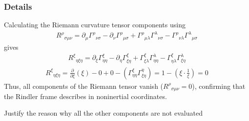 \documentclass[letterpaper,10pt,english]{jupyterBook}
\begin{document}
\subsubsection*{Details}

\sphinxAtStartPar
Calculating the Riemann curvature tensor components using
\begin{equation*}
\begin{split}R^\rho{}_{\sigma\mu\nu} = \partial_\mu \Gamma^\rho{}_{\nu\sigma} - \partial_\nu \Gamma^\rho{}_{\mu\sigma} + \Gamma^\rho{}_{\mu\lambda}\Gamma^\lambda{}_{\nu\sigma} - \Gamma^\rho{}_{\nu\lambda}\Gamma^\lambda{}_{\mu\sigma}\end{split}
\end{equation*}
\sphinxAtStartPar
gives
\begin{equation*}
\begin{split}R^{\xi}{}_{\eta\xi\eta} = \partial_{\xi}\Gamma^{\xi}_{\eta\eta} - \partial_\eta \Gamma^{\xi}_{\xi\eta} + \Gamma^{\xi}_{\xi\lambda}\Gamma^\lambda_{\eta\eta} - \Gamma^{\xi}_{\eta\lambda}\Gamma^\lambda_{\xi\eta}\end{split}
\end{equation*}\begin{equation*}
\begin{split}R^{\xi}{}_{\eta\xi\eta} = \frac{\partial}{\partial\xi}(\xi) - 0 + 0 - \left(\Gamma^{\xi}_{\eta\eta}\Gamma^\eta_{\xi\eta}\right) = 1 - \left(\xi \cdot \frac{1}{\xi}\right) = 0\end{split}
\end{equation*}
\sphinxAtStartPar
Thus, all components of the Riemann tensor vanish (\(R^\rho{}_{\sigma\mu\nu} = 0\)), confirming that the Rindler frame describes  in non\sphinxhyphen{}inertial coordinates.

\sphinxAtStartPar
{} Justify the reason why all the other components are not evaluated
\end{document}
